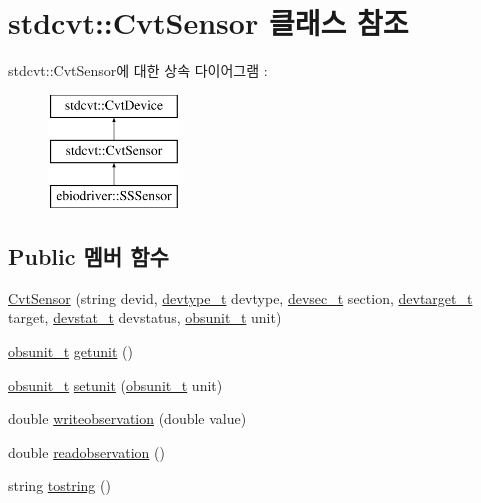 \hypertarget{classstdcvt_1_1CvtSensor}{}\section{stdcvt\+:\+:Cvt\+Sensor 클래스 참조}
\label{classstdcvt_1_1CvtSensor}
stdcvt\+:\+:Cvt\+Sensor에 대한 상속 다이어그램 \+: \begin{figure}[H]
\begin{center}
\leavevmode
\includegraphics[height=3.000000cm]{classstdcvt_1_1CvtSensor}
\end{center}
\end{figure}
\subsection*{Public 멤버 함수}
\begin{DoxyCompactItemize}
\item 
\hyperlink{classstdcvt_1_1CvtSensor_a5a96080e1e889105272baaacba00c3af}{Cvt\+Sensor} (string devid, \hyperlink{cvtcode_8h_ae8e34073e35cef0bb47c7fa535fc638b}{devtype\+\_\+t} devtype, \hyperlink{cvtcode_8h_a268eebb73363e24b9e65fd51973bd9c0}{devsec\+\_\+t} section, \hyperlink{cvtcode_8h_a2b37fd5cc4d40c0b8c4b987c271e5ceb}{devtarget\+\_\+t} target, \hyperlink{cvtcode_8h_ad21cd565f839adc5b19a0993e7da7278}{devstat\+\_\+t} devstatus, \hyperlink{cvtcode_8h_a6d4ed81d95144c5eedcd08eda1e800a4}{obsunit\+\_\+t} unit)
\item 
\hyperlink{cvtcode_8h_a6d4ed81d95144c5eedcd08eda1e800a4}{obsunit\+\_\+t} \hyperlink{classstdcvt_1_1CvtSensor_ac4342e95b9977063bb4e37ce1418759c}{getunit} ()
\item 
\hyperlink{cvtcode_8h_a6d4ed81d95144c5eedcd08eda1e800a4}{obsunit\+\_\+t} \hyperlink{classstdcvt_1_1CvtSensor_a0e13dd86635e5077dbadc6c0fe396b5e}{setunit} (\hyperlink{cvtcode_8h_a6d4ed81d95144c5eedcd08eda1e800a4}{obsunit\+\_\+t} unit)
\item 
double \hyperlink{classstdcvt_1_1CvtSensor_aba7a61d2f5fac1c100a17a8831727b29}{writeobservation} (double value)
\item 
double \hyperlink{classstdcvt_1_1CvtSensor_a2d3b6d09f67166af035189b59590cf82}{readobservation} ()
\item 
string \hyperlink{classstdcvt_1_1CvtSensor_aa9f10c534408e35f1d761941a8320e50}{tostring} ()
\end{DoxyCompactItemize}


